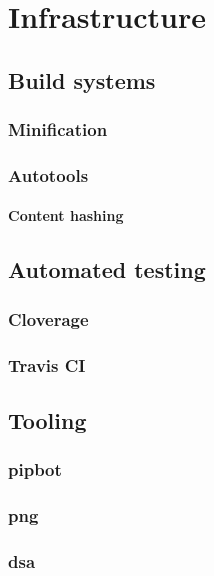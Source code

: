 \chapter{Infrastructure}



\section{Build systems}
\subsection{Minification}
\subsection{Autotools}
\subsubsection{Content hashing}

\section{Automated testing}
\subsection{Cloverage}
\subsection{Travis CI}

\section{Tooling}
\subsection{pipbot}
\subsection{png}
\subsection{dsa}
